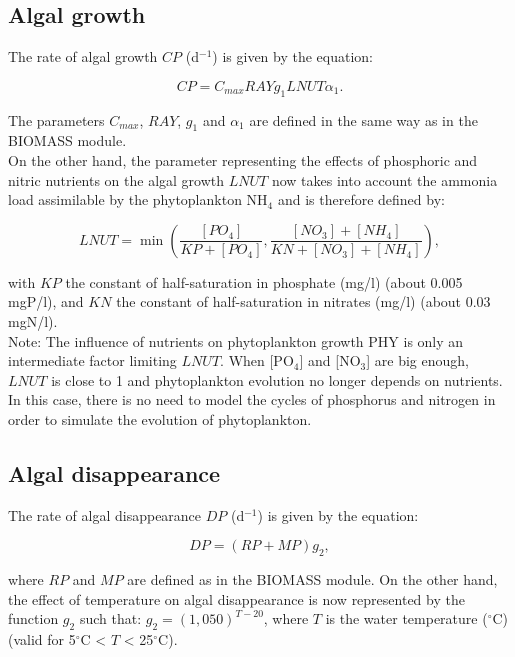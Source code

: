 \subsection{Algal growth}

The rate of algal growth $CP$ (d$^{-1}$) is given by the equation:

\begin{equation}
  CP = C_{max} RAY g_1 LNUT \alpha_1.
\end{equation}

The parameters $C_{max}$, $RAY$, $g_1$ and $\alpha_1$ are defined in the same way as in the BIOMASS module.\\

On the other hand, the parameter representing the effects of phosphoric
and nitric nutrients on the algal growth $LNUT$ now takes into account
the ammonia load assimilable by the phytoplankton NH$_4$ and is therefore defined by:

\begin{equation}
  LNUT = \min \left( \frac{[PO_4]}{KP+[PO_4]}, \frac{[NO_3]+[NH_4]}{KN+[NO_3]+[NH_4]} \right),
\end{equation}

with $KP$ the constant of half-saturation in phosphate (mg/l) (about 0.005 mgP/l),
and $KN$ the constant of half-saturation in nitrates (mg/l) (about 0.03 mgN/l).\\

Note: The influence of nutrients on phytoplankton growth PHY is only an intermediate factor limiting $LNUT$.
When [PO$_4$] and [NO$_3$] are big enough, $LNUT$ is close to 1
and phytoplankton evolution no longer depends on nutrients.
In this case, there is no need to model the cycles of phosphorus and
nitrogen in order to simulate the evolution of phytoplankton.

\subsection{Algal disappearance}

The rate of algal disappearance $DP$ (d$^{-1}$) is given by the equation:

\begin{equation}
  DP = (RP + MP) g_2,
\end{equation}

where $RP$ and $MP$ are defined as in the BIOMASS module.
On the other hand, the effect of temperature on algal disappearance
is now represented by the function $g_2$ such that: $g_2 = (1,050)^{T-20}$,
where $T$ is the water temperature ($^{\circ}$C) (valid for 5$^{\circ}$C < $T$ < 25$^{\circ}$C).

